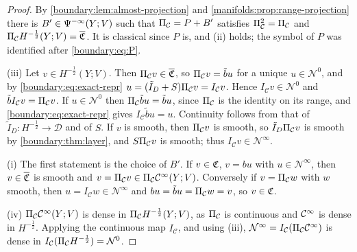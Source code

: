 \begin{proof}
By \cref{boundary:lem:almost-projection} and \cref{manifolds:prop:range-projection} there
is $B'\in\Psi^{-\infty}(Y;V)$ such that $\Pi_{\mathcal{C}}=P+B'$ satisfies $\Pi_{\mathcal{C}}^2=\Pi_{\mathcal{C}}$ and
$\Pi_{\mathcal{C}} H^{-\frac12}(Y;V)=\overline{\mathfrak{C}}$. It is classical since $P$ is, and (ii) holds;
the symbol of $P$ was identified after \eqref{boundary:eq:P}.

(iii) Let $v\in H^{-\frac12}(Y;V)$. Then $\Pi_{\mathcal{C}} v\in\overline{\mathfrak{C}}$, so $\Pi_{\mathcal{C}} v=\tilde bu$
for a unique $u\in\mathcal{N}^0$, and by \eqref{boundary:eq:exact-repr} $u=(\tilde I_D+S)
\Pi_{\mathcal{C}} v=I_{\mathcal C}v$. Hence $I_{\mathcal C}v\in\mathcal{N}^0$ and $\tilde bI_{\mathcal
C}v=\Pi_{\mathcal{C}} v$. If $u\in\mathcal{N}^0$ then $\Pi_{\mathcal{C}}\tilde bu=\tilde bu$, since $\Pi_{\mathcal{C}}$ is the
identity on its range, and \eqref{boundary:eq:exact-repr} gives $I_{\mathcal C}\tilde bu=
u$. Continuity follows from that of $\tilde I_D:H^{-\frac12}\to\mathcal D$ and of $S$. If
$v$ is smooth, then $\Pi_{\mathcal{C}} v$ is smooth, so $\tilde I_D\Pi_{\mathcal{C}} v$ is smooth by
\cref{boundary:thm:layer}, and $S\Pi_{\mathcal{C}} v$ is smooth; thus $I_{\mathcal C}v\in
\mathcal{N}^\infty$.

(i) The first statement is the choice of $B'$. If $v\in\mathfrak{C}$, $v=bu$ with $u\in
\mathcal{N}^\infty$, then $v\in\overline{\mathfrak{C}}$ is smooth and $v=\Pi_{\mathcal{C}} v\in\Pi_{\mathcal{C}}\mathcal{C}^\infty(Y;V)$.
Conversely if $v=\Pi_{\mathcal{C}} w$ with $w$ smooth, then $u=I_{\mathcal C}w\in\mathcal{N}^\infty$
and $bu=\tilde bu=\Pi_{\mathcal{C}} w=v$, so $v\in\mathfrak{C}$.

(iv) $\Pi_{\mathcal{C}}\mathcal{C}^\infty(Y;V)$ is dense in $\Pi_{\mathcal{C}} H^{-\frac12}(Y;V)$, as $\Pi_{\mathcal{C}}$ is continuous and
$\mathcal{C}^\infty$ is dense in $H^{-\frac12}$. Applying the continuous map $I_{\mathcal C}$, and using
(iii), $\mathcal{N}^\infty=I_{\mathcal C}(\Pi_{\mathcal{C}}\mathcal{C}^\infty)$ is dense in $I_{\mathcal C}(\Pi_{\mathcal{C}}
H^{-\frac12})=\mathcal{N}^0$.
\end{proof}

